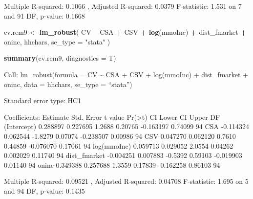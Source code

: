 \documentclass[
]{article}
\newenvironment{Shaded}{\begin{snugshade}}{\end{snugshade}}
\newcommand{\DataTypeTok}[1]{\textcolor[rgb]{0.13,0.29,0.53}{#1}}
\newcommand{\KeywordTok}[1]{\textcolor[rgb]{0.13,0.29,0.53}{\textbf{#1}}}
\newcommand{\NormalTok}[1]{#1}
\newcommand{\OperatorTok}[1]{\textcolor[rgb]{0.81,0.36,0.00}{\textbf{#1}}}
\newcommand{\StringTok}[1]{\textcolor[rgb]{0.31,0.60,0.02}{#1}}
\begin{document}
Multiple R-squared: 0.1066 , Adjusted R-squared: 0.0379 F-statistic:
1.531 on 7 and 91 DF, p-value: 0.1668

\begin{Shaded}
\begin{Highlighting}[]
\NormalTok{cv.rem9 <-}
\StringTok{  }\KeywordTok{lm_robust}\NormalTok{(}
\NormalTok{    CV }\OperatorTok{~}\StringTok{ }\NormalTok{CSA }\OperatorTok{+}\StringTok{ }\NormalTok{CSV }\OperatorTok{+}\StringTok{ }\KeywordTok{log}\NormalTok{(mmoInc) }\OperatorTok{+}\StringTok{ }\NormalTok{dist_fmarket }\OperatorTok{+}\StringTok{ }\NormalTok{oninc,}
\NormalTok{    hhchars,}
    \DataTypeTok{se_type =} \StringTok{"stata"}
\NormalTok{  )}

\KeywordTok{summary}\NormalTok{(cv.rem9, }\DataTypeTok{diagnostics =}\NormalTok{ T)}
\end{Highlighting}
\end{Shaded}

Call: lm\_robust(formula = CV \textasciitilde{} CSA + CSV + log(mmoInc)
+ dist\_fmarket + oninc, data = hhchars, se\_type = ``stata'')

Standard error type: HC1

Coefficients: Estimate Std. Error t value
Pr(\textgreater\textbar t\textbar) CI Lower CI Upper DF (Intercept)
0.288897 0.227695 1.2688 0.20765 -0.163197 0.74099 94 CSA -0.114324
0.062544 -1.8279 0.07074 -0.238507 0.00986 94 CSV 0.047270 0.062120
0.7610 0.44859 -0.076070 0.17061 94 log(mmoInc) 0.059713 0.029052 2.0554
0.04262 0.002029 0.11740 94 dist\_fmarket -0.004251 0.007883 -0.5392
0.59103 -0.019903 0.01140 94 oninc 0.349388 0.257688 1.3559 0.17839
-0.162258 0.86103 94

Multiple R-squared: 0.09521 , Adjusted R-squared: 0.04708 F-statistic:
1.695 on 5 and 94 DF, p-value: 0.1435
\end{document}
